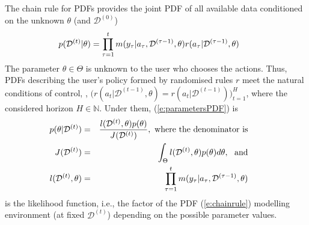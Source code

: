 The chain rule for PDFs provides the joint PDF of all available data conditioned on the unknown $\theta$
(and $\mathcal{D}^{(0)}$)
\begin{equation}
 \label{e:chainrule}
    \hspace*{-4ex}
p(\mathcal{D}^{(t)}|\theta) = \prod_{\tau = 1}^{t} m(y_{\tau}|a_{\tau}, \mathcal{D}^{(\tau-1)}, \theta)r(a_{\tau}|\mathcal{D}^{(\tau-1)}, \theta)
\end{equation}
The parameter $\theta\in \Theta$ is unknown to the user who chooses the actions. Thus, PDFs describing the user's policy formed by randomised rules $r$ meet the natural conditions of control, \cite{Pet:81}, $\big(r(a_{t}|\mathcal{D}^{(t-1)}, \theta) = r(a_{t}|\mathcal{D}^{(t-1)})\big)_{t=1}^{H}$, where the considered horizon $H\in \mathbb{N}$. Under them, (\ref{e:parametersPDF}) is
\begin{eqnarray}
\nonumber
\hspace*{-4ex}p(\theta|\mathcal{D}^{(t)}) &=& \frac{l(\mathcal{D}^{(t)},\theta)p(\theta)}{J(\mathcal{D}^{(t)})},
\mbox{ where the denominator is}\\
\nonumber
\hspace*{-4ex}J(\mathcal{D}^{(t)})&=&
\int_{\Theta} l(\mathcal{D}^{(t)},\theta)p(\theta)d\theta,\ \mbox{ and}\\
\label{e:likelihooddef}
\hspace*{-4ex}l(\mathcal{D}^{(t)},\theta) &=&\prod_{\tau = 1}^{t} m(y_{\tau}|a_{\tau}, \mathcal{D}^{(\tau-1)}, \theta)
\end{eqnarray}
is the likelihood function, i.e., the factor of the PDF (\ref{e:chainrule}) modelling environment (at fixed $\mathcal{D}^{(t)}$) depending on the possible parameter values.

